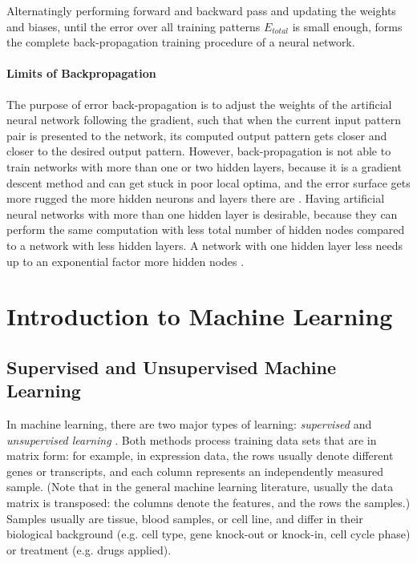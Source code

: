 Alternatingly performing forward and backward pass and updating the
weights and biases, until the error over all training patterns $E_{total}$
is small enough, forms the complete back-propagation training procedure
of a neural network.

\paragraph{Limits of Backpropagation}

The purpose of error back-propagation is to adjust the weights of
the artificial neural network following the gradient, such that when
the current input pattern pair is presented to the network, its computed
output pattern gets closer and closer to the desired output pattern.
However, back-propagation is not able to train networks with more
than one or two hidden layers, because it is a gradient descent method
and can get stuck in poor local optima, and the error surface gets
more rugged the more hidden neurons and layers there are \cite{GoriTesi1992}.
Having artificial neural networks with more than one hidden layer
is desirable, because they can perform the same computation with less
total number of hidden nodes compared to a network with less hidden
layers. A network with one hidden layer less needs up to an exponential
factor more hidden nodes \cite{Hastad1987}.

\section{Introduction to Machine Learning}

\subsection{Supervised and Unsupervised Machine Learning}

In machine learning, there are two major types of learning: \emph{supervised}
and \emph{unsupervised learning}
\cite{Barber2012}. Both methods process training data sets that are
in matrix form: for example, in expression data, the rows usually
denote different genes or transcripts, and each column represents
an independently measured sample. (Note that in the general machine
learning literature, usually the data matrix is transposed: the columns
denote the features, and the rows the samples.) Samples usually are
tissue, blood samples, or cell line, and differ in their biological
background (e.g. cell type, gene knock-out or knock-in, cell cycle
phase) or treatment (e.g. drugs applied).

